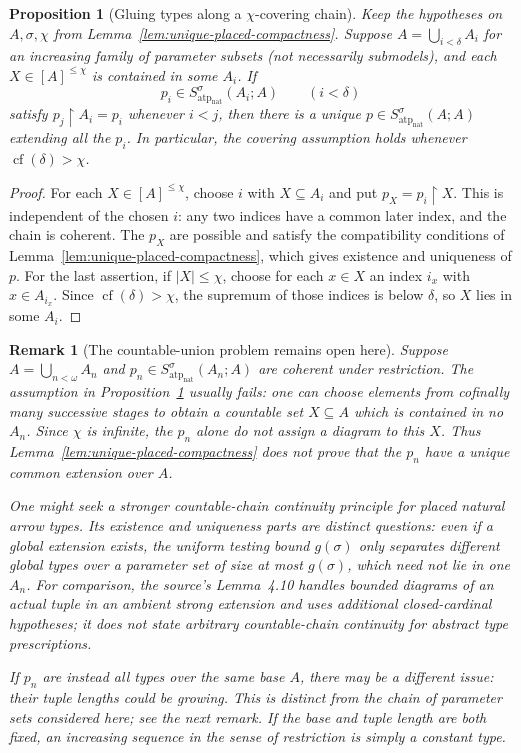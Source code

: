 \documentclass[11pt]{article}
\newcommand{\natatp}{\operatorname{atp}_{\mathrm{nat}}}
\theoremstyle{plain}
\newtheorem{proposition}[definition]{Proposition}
\newtheorem{remark}[definition]{Remark}
\begin{document}
\begin{proposition}[Gluing types along a $\chi$-covering chain]
\label{prop:covering-chain-gluing}
Keep the hypotheses on $A,\sigma,\chi$
from Lemma~\ref{lem:unique-placed-compactness}.
Suppose $A=\bigcup_{i<\delta}A_i$ for an
increasing family of parameter subsets
(not necessarily submodels), and
each $X\in[A]^{\leq\chi}$ is contained
in some $A_i$.
If
\[
p_i\in S^\sigma_{\natatp}(A_i;A)
\qquad(i<\delta)
\]
satisfy $p_j\restriction A_i=p_i$
whenever $i<j$, then there is a unique
$p\in S^\sigma_{\natatp}(A;A)$
extending all the $p_i$.
In particular, the covering assumption holds
whenever $\operatorname{cf}(\delta)>\chi$.
\end{proposition}
\begin{proof}
For each $X\in[A]^{\leq\chi}$, choose $i$
with $X\subseteq A_i$ and put
$p_X=p_i\restriction X$.
This is independent of the chosen $i$:
any two indices have a common later index,
and the chain is coherent. The $p_X$
are possible and satisfy the compatibility
conditions of Lemma~\ref{lem:unique-placed-compactness},
which gives existence and uniqueness of $p$.
For the last assertion, if $|X|\leq\chi$,
choose for each $x\in X$ an index $i_x$
with $x\in A_{i_x}$. Since
$\operatorname{cf}(\delta)>\chi$,
the supremum of those indices is below
$\delta$, so $X$ lies in some $A_i$.
\end{proof}

\begin{remark}[The countable-union problem remains open here]
\label{rem:countable-chain-natural-types}
Suppose $A=\bigcup_{n<\omega}A_n$ and
$p_n\in S^\sigma_{\natatp}(A_n;A)$
are coherent under restriction.
The assumption in
Proposition~\ref{prop:covering-chain-gluing}
usually fails: one can choose elements
from cofinally many successive stages to
obtain a countable set $X\subseteq A$
which is contained in no $A_n$.
Since $\chi$ is infinite, the $p_n$
alone do not assign a diagram to this $X$.
Thus Lemma~\ref{lem:unique-placed-compactness}
does not prove that the $p_n$ have a unique
common extension over $A$.

One might seek a stronger \emph{countable-chain
continuity} principle for placed natural
arrow types. Its existence and uniqueness
parts are distinct questions: even if a
global extension exists, the uniform
testing bound $g(\sigma)$ only separates
different global types over a parameter
set of size at most $g(\sigma)$, which
need not lie in one $A_n$.
For comparison, the source's Lemma~4.10
handles \emph{bounded diagrams of an actual
tuple in an ambient strong extension} and
uses additional closed-cardinal hypotheses;
it does not state arbitrary countable-chain
continuity for abstract type prescriptions.

If $p_n$ are instead all types \emph{over
the same base $A$}, there may be a different
issue: their \emph{tuple lengths} could be
growing. This is distinct from the chain
of parameter sets considered here; see
the next remark. If the base and tuple
length are both fixed, an increasing
sequence in the sense of restriction is
simply a constant type.
\end{remark}
\end{document}
